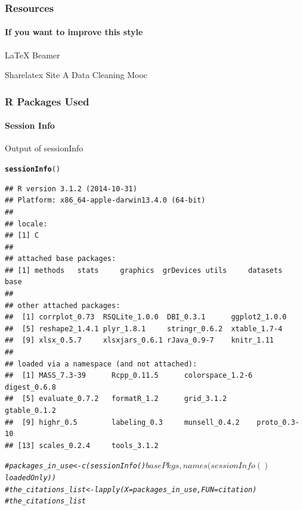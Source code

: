 \documentclass[10pt,handout,english]{beamer}\usepackage[]{graphicx}\usepackage[]{color}
\makeatletter
\newcommand{\hlcom}[1]{\textcolor[rgb]{0.678,0.584,0.686}{\textit{#1}}}%
\newcommand{\hlstd}[1]{\textcolor[rgb]{0.345,0.345,0.345}{#1}}%
\newcommand{\hlkwd}[1]{\textcolor[rgb]{0.737,0.353,0.396}{\textbf{#1}}}%
\newenvironment{kframe}{%
 \def\at@end@of@kframe{}%
 \ifinner\ifhmode%
  \def\at@end@of@kframe{\end{minipage}}%
  \begin{minipage}{\columnwidth}%
 \fi\fi%
 \def\FrameCommand##1{\hskip\@totalleftmargin \hskip-\fboxsep
 \colorbox{shadecolor}{##1}\hskip-\fboxsep
     \hskip-\linewidth \hskip-\@totalleftmargin \hskip\columnwidth}%
 \MakeFramed {\advance\hsize-\width
   \@totalleftmargin\z@ \linewidth\hsize
   \@setminipage}}%
 {\par\unskip\endMakeFramed%
 \at@end@of@kframe}
\newenvironment{knitrout}{}{} %
\makeatother
\begin{document}
\begin{frame}
  \frametitle{Resources}
  \framesubtitle{If you want to improve this style}
  \begin{thebibliography}{10}

  \beamertemplatearticlebibitems
    LaTeX Beamer

  \bibitem{}
    Sharelatex Site %
  \bibitem{}
    A Data Cleaning Mooc %
  \end{thebibliography}
\end{frame}

\begin{frame}[fragile]
  \frametitle{R Packages Used}
  \framesubtitle{Session Info}
\begin{block}{Output of sessionInfo}
\end{block}
\begin{knitrout}
\color{fgcolor}\begin{kframe}
\begin{alltt}
\hlkwd{sessionInfo}\hlstd{()}
\end{alltt}
\begin{verbatim}
## R version 3.1.2 (2014-10-31)
## Platform: x86_64-apple-darwin13.4.0 (64-bit)
## 
## locale:
## [1] C
## 
## attached base packages:
## [1] methods   stats     graphics  grDevices utils     datasets  base     
## 
## other attached packages:
##  [1] corrplot_0.73  RSQLite_1.0.0  DBI_0.3.1      ggplot2_1.0.0 
##  [5] reshape2_1.4.1 plyr_1.8.1     stringr_0.6.2  xtable_1.7-4  
##  [9] xlsx_0.5.7     xlsxjars_0.6.1 rJava_0.9-7    knitr_1.11    
## 
## loaded via a namespace (and not attached):
##  [1] MASS_7.3-39      Rcpp_0.11.5      colorspace_1.2-6 digest_0.6.8    
##  [5] evaluate_0.7.2   formatR_1.2      grid_3.1.2       gtable_0.1.2    
##  [9] highr_0.5        labeling_0.3     munsell_0.4.2    proto_0.3-10    
## [13] scales_0.2.4     tools_3.1.2
\end{verbatim}
\begin{alltt}
\hlcom{#  packages_in_use <- c( sessionInfo()$basePkgs, names( sessionInfo()$loadedOnly ) )}
\hlcom{#the_citations_list <- lapply( X=packages_in_use, FUN=citation)}
\hlcom{#the_citations_list}
\end{alltt}
\end{kframe}
\end{knitrout}
\end{frame}
\end{document}
